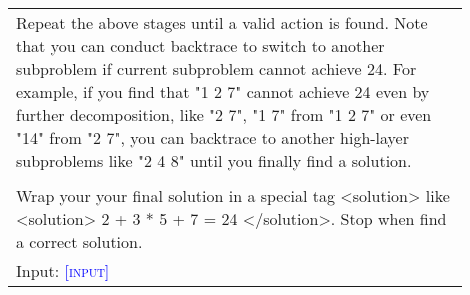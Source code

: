 \begin{table*}[t]
\begin{tabular}{p{0.9\linewidth}}
\\
Repeat the above stages until a valid action is found. Note that you can conduct backtrace to switch to another subproblem if current subproblem cannot achieve 24. For example, if you find that "1 2 7" cannot achieve 24 even by further decomposition, like "2 7", "1 7" from "1 2 7" or even "14" from "2 7", you can backtrace to another high-layer subproblems like "2 4 8" until you finally find a solution. \\
\\
Wrap your your final solution in a special tag <solution> like <solution> 2 + 3 * 5 + 7 = 24 </solution>. Stop when find a correct solution.\\
Input: \textcolor{blue}{\textsc{[input]}}
\\ \bottomrule
\end{tabular}
\label{tab:low_level_self_search_prompt}
\end{table*}

